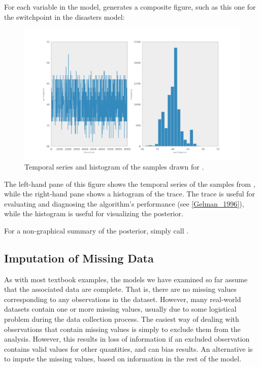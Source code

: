 \documentclass[letterpaper,10pt,english]{sphinxmanual}
\begin{document}
For each variable in the model,  generates a composite figure, such as this one for the switchpoint in the disasters model:
\begin{figure}[htbp]
\centering
\capstart

\includegraphics{spost.pdf}
\caption{Temporal series and histogram of the samples drawn for .}\end{figure}

The left-hand pane of this figure shows the temporal series of the samples from , while the right-hand pane shows a histogram of the trace. The trace is useful for evaluating and diagnosing the algorithm's performance (see {\hyperref[references:gelman-1996]{{[}Gelman\_1996{]}}}), while the histogram is useful for visualizing the posterior.

For a non-graphical summary of the posterior, simply call .


\subsection{Imputation of Missing Data}
\label{tutorial:imputation-of-missing-data}
As with most textbook examples, the models we have examined so far assume that the associated data are complete. That is, there are no missing values corresponding to any observations in the dataset. However, many real-world datasets contain one or more missing values, usually due to some logistical problem during the data collection process. The easiest way of dealing with observations that contain missing values is simply to exclude them from the analysis. However, this results in loss of information if an excluded observation contains valid values for other quantities, and can bias results. An alternative is to impute the missing values, based on information in the rest of the model.
\end{document}
